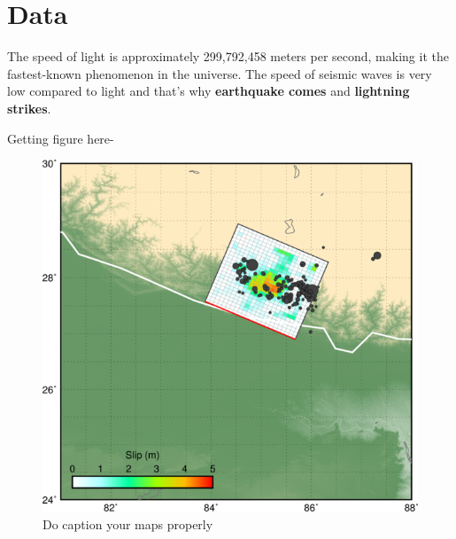 \chapter{Data}
The speed of light is approximately 299,792,458 meters per second, making it the fastest-known phenomenon in the universe. The speed of seismic waves is very low compared to light and that's why \textbf{earthquake comes} and \textbf{lightning strikes}.

Getting figure here- 

\begin{figure}[H]
    \centering
    \includegraphics[width=\textwidth]{basemap.png}
    \caption{ Do caption your maps properly}
    \label{fig:well}
\end{figure}


\newpage

